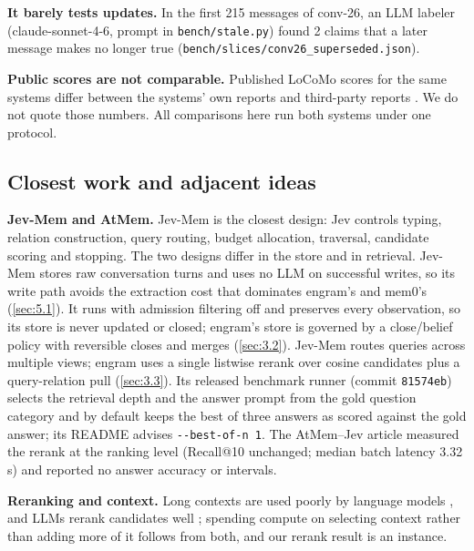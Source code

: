 \documentclass[11pt]{article}
\newcommand{\src}[1]{}
\begin{document}
\textbf{It barely tests updates.} In the first 215\src{bench/results/e2\_jev\_\_stress.json} messages of conv-26, an LLM labeler (claude-sonnet-4-6, prompt in \texttt{bench/\allowbreak{}stale.py}) found 2\src{bench/results/e0\_baseline\_\_stress.json} claims that a later message makes no longer true (\texttt{bench/\allowbreak{}slices/\allowbreak{}conv26\_\allowbreak{}superseded.json}).

\textbf{Public scores are not comparable.} Published LoCoMo scores for the same systems differ between the systems' own reports and third-party reports \citep{mem0blog2026benchmarks,byteroverblog2026benchmark}. We do not quote those numbers. All comparisons here run both systems under one protocol.

\subsection{Closest work and adjacent ideas}\label{sec:2.4}
\textbf{Jev-Mem and AtMem.} Jev-Mem \citep{jiang2026jevmem} is the closest design: Jev controls typing, relation construction, query routing, budget allocation, traversal, candidate scoring and stopping. The two designs differ in the store and in retrieval. Jev-Mem stores raw conversation turns and uses no LLM on successful writes, so its write path avoids the extraction cost that dominates engram's and mem0's (\cref{sec:5.1}). It runs with admission filtering off and preserves every observation, so its store is never updated or closed; engram's store is governed by a close/belief policy with reversible closes and merges (\cref{sec:3.2}). Jev-Mem routes queries across multiple views; engram uses a single listwise rerank over cosine candidates plus a query-relation pull (\cref{sec:3.3}). Its released benchmark runner (commit \texttt{81574eb}) selects the retrieval depth and the answer prompt from the gold question category and by default keeps the best of three answers as scored against the gold answer; its README advises \texttt{-{}-best-of-n 1}. The AtMem--Jev article \citep{taghia2026atmem} measured the rerank at the ranking level (Recall@10 unchanged; median batch latency 3.32\src{taghia2026atmem (median batch latency, s)} s) and reported no answer accuracy or intervals.

\textbf{Reranking and context.} Long contexts are used poorly by language models \citep{liu2024lost}, and LLMs rerank candidates well \citep{sun2023rankgpt}; spending compute on selecting context rather than adding more of it follows from both, and our rerank result is an instance.
\end{document}
